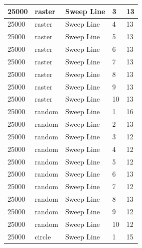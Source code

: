 \documentclass[12pt]{article}
\begin{document}
\begin{longtable}{|l|l|l|l|l|}
25000        & raster            & Sweep Line & 3          & 13                            \\ \hline
25000        & raster            & Sweep Line & 4          & 13                            \\ \hline
25000        & raster            & Sweep Line & 5          & 13                            \\ \hline
25000        & raster            & Sweep Line & 6          & 13                            \\ \hline
25000        & raster            & Sweep Line & 7          & 13                            \\ \hline
25000        & raster            & Sweep Line & 8          & 13                            \\ \hline
25000        & raster            & Sweep Line & 9          & 13                            \\ \hline
25000        & raster            & Sweep Line & 10         & 13                            \\ \hline
25000        & random            & Sweep Line & 1          & 16                            \\ \hline
25000        & random            & Sweep Line & 2          & 13                            \\ \hline
25000        & random            & Sweep Line & 3          & 12                            \\ \hline
25000        & random            & Sweep Line & 4          & 12                            \\ \hline
25000        & random            & Sweep Line & 5          & 12                            \\ \hline
25000        & random            & Sweep Line & 6          & 13                            \\ \hline
25000        & random            & Sweep Line & 7          & 12                            \\ \hline
25000        & random            & Sweep Line & 8          & 13                            \\ \hline
25000        & random            & Sweep Line & 9          & 12                            \\ \hline
25000        & random            & Sweep Line & 10         & 12                            \\ \hline
25000        & circle            & Sweep Line & 1          & 15                            \\ \hline

\end{longtable}
\end{document}
